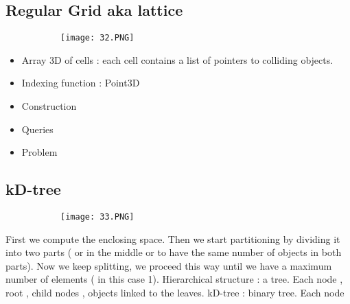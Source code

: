 \documentclass{article}
\begin{document}
\subsection{Regular Grid aka lattice}

\begin{figure}[ht!]
  \centering
  \begin{subfigure}[b]{0.5\linewidth}
    \texttt{[image: 32.PNG]}
  \end{subfigure}
\end{figure}

\begin{itemize}
    \item Array 3D of cells : each cell contains a list of pointers to colliding objects.
    \item Indexing function : Point3D 
    \item Construction 
    \item Queries 
    \item Problem 
\end{itemize}

\subsection{kD-tree}

\begin{figure}[ht!]
  \centering
  \begin{subfigure}[b]{0.5\linewidth}
    \texttt{[image: 33.PNG]}
  \end{subfigure}
\end{figure}


First we compute the enclosing space. Then we start partitioning by dividing it into two parts ( or in the middle or to have the same number of objects in both parts). Now we keep splitting, we proceed this way until we have a maximum number of elements ( in this case 1).
\vspace{3mm}
Hierarchical structure : a tree. 
Each node , root , child nodes , objects linked to the leaves.
\vspace{3mm}
kD-tree : binary tree.
Each node 
\end{document}
